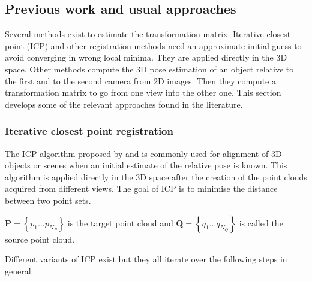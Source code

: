 \subsection{Previous work and usual approaches}
\label{section:registration_previous_work}
Several methods exist to estimate the transformation matrix. Iterative closest point (ICP) and other registration methods need an approximate initial guess to avoid converging in wrong local minima. They are applied directly in the 3D space. Other methods compute the 3D pose estimation of an object relative to the first and to the second camera from 2D images. Then they compute a transformation matrix to go from one view into the other one. This section develops some of the relevant approaches found in the literature.



\subsubsection{Iterative closest point registration}
\label{section:Iterative closest point registration}

The ICP algorithm proposed by \cite{besl_method_1992} and \cite{chen_object_1992} is commonly used for alignment of 3D objects or scenes when an initial estimate of the relative pose is known. This algorithm is applied directly in the 3D space after the creation of the point clouds acquired from different views. The goal of ICP is to minimise the distance between two point sets.

$\mathbf{P}=\left\{p_{1} \ldots p_{N_{P}}\right\}$ is the target point cloud and $\mathbf{Q}=\left\{q_{1} \ldots q_{N_{Q}}\right\}$ is called the source point cloud.
 
 Different variants of ICP exist but they all iterate over the following steps in general:

